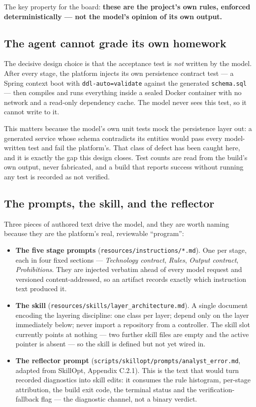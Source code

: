 \documentclass[11pt,a4paper]{article}
\begin{document}
The key property for the board: \textbf{these are the project's own rules, enforced
deterministically --- not the model's opinion of its own output.}

\subsection{The agent cannot grade its own homework}

The decisive design choice is that the acceptance test is \emph{not} written by the
model. After every stage, the platform injects its own persistence contract test --- a
Spring context boot with \texttt{ddl-auto=validate} against the generated
\texttt{schema.sql} --- then compiles and runs everything inside a sealed Docker
container with no network and a read-only dependency cache. The model never sees this
test, so it cannot write to it.

This matters because the model's own unit tests mock the persistence layer out: a
generated service whose schema contradicts its entities would pass every model-written
test and fail the platform's. That class of defect has been caught here, and it is
exactly the gap this design closes. Test counts are read from the build's own output,
never fabricated, and a build that reports success without running any test is
recorded as not verified.

\subsection{The prompts, the skill, and the reflector}

Three pieces of authored text drive the model, and they are worth naming because they
are the platform's real, reviewable ``program'':

\begin{itemize}[leftmargin=1.4em]
  \item \textbf{The five stage prompts} (\texttt{resources/instructions/*.md}). One
  per stage, each in four fixed sections --- \emph{Technology contract}, \emph{Rules},
  \emph{Output contract}, \emph{Prohibitions}. They are injected verbatim ahead of
  every model request and versioned content-addressed, so an artifact records exactly
  which instruction text produced it.
  \item \textbf{The skill} (\texttt{resources/skills/layer\_architecture.md}). A
  single document encoding the layering discipline: one class per layer; depend only
  on the layer immediately below; never import a repository from a controller. The
  skill slot currently points at nothing --- two further skill files are empty and the
  active pointer is absent --- so the skill is defined but not yet wired in.
  \item \textbf{The reflector prompt} (\texttt{scripts/skillopt/prompts/analyst\_error.md},
  adapted from SkillOpt, Appendix C.2.1). This is the text that would turn recorded
  diagnostics into skill edits: it consumes the rule histogram, per-stage attribution,
  the build exit code, the terminal status and the verification-fallback flag --- the
  diagnostic channel, not a binary verdict.
\end{itemize}
\end{document}

